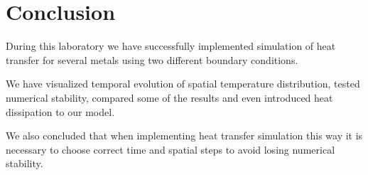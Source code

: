 \documentclass[12pt]{article}
\begin{document}
\section{Conclusion}

During this laboratory we have successfully implemented simulation of heat transfer for several metals using two different boundary conditions. 

We have visualized temporal evolution of spatial temperature distribution, tested numerical stability, compared some of the results and even introduced heat dissipation to our model.

We also concluded that when implementing heat transfer simulation this way it is necessary to choose correct time and spatial steps to avoid losing numerical stability.
\end{document}
